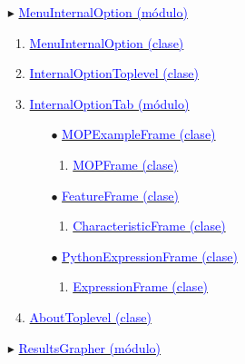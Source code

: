 \documentclass[12pt,twoside]{article}
\begin{document}
\begin{itemize}
\begin{enumerate}[$\square$]
\begin{itemize}
            \item[$\blacktriangleright$] \hyperref[sec:a_3_3_2]{\textcolor{blue}{MenuInternalOption (módulo)}}
                  \begin{enumerate}[$\triangleright$]
                  \item \hyperref[sec:a_3_3_2_1]{\textcolor{blue}{MenuInternalOption (clase)}}
                  \item \hyperref[sec:a_3_3_2_2]{\textcolor{blue}{InternalOptionToplevel (clase)}}
                  \item \hyperref[sec:a_3_3_2_3]{\textcolor{blue}{InternalOptionTab (módulo)}}
                        \begin{itemize}
                        \item[$\bullet$] \hyperref[sec:a_3_3_2_3_1]{\textcolor{blue}{MOPExampleFrame (clase)}}
                              \begin{enumerate}[$\circ$]
                              \item \hyperref[sec:a_3_3_2_3_1_1]{\textcolor{blue}{MOPFrame (clase)}}
                              \end{enumerate}
                        \item[$\bullet$] \hyperref[sec:a_3_3_2_3_2]{\textcolor{blue}{FeatureFrame (clase)}}
                              \begin{enumerate}[$\circ$]
                              \item \hyperref[sec:a_3_3_2_3_2_1]{\textcolor{blue}{CharacteristicFrame (clase)}}
                              \end{enumerate}
                        \item[$\bullet$] \hyperref[sec:a_3_3_2_3_3]{\textcolor{blue}{PythonExpressionFrame (clase)}}
                              \begin{enumerate}[$\circ$]
                              \item \hyperref[sec:a_3_3_2_3_3_1]{\textcolor{blue}{ExpressionFrame (clase)}}
                              \end{enumerate}
                        \end{itemize}
                  \item \hyperref[sec:a_3_3_2_4]{\textcolor{blue}{AboutToplevel (clase)}}
                  \end{enumerate}
            \item[$\blacktriangleright$] \hyperref[sec:a_3_3_3]{\textcolor{blue}{ResultsGrapher (módulo)}}

\end{itemize}
\end{enumerate}
\end{itemize}
\end{document}
